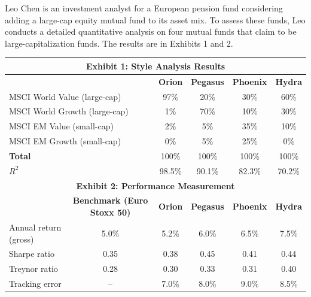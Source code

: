 \documentclass{article}
\newcounter{question} %
\begin{document}
\begin{question}
    Leo Chen is an investment analyst for a European pension fund considering adding a large-cap equity mutual fund to its asset mix. To assess these funds, Leo conducts a detailed quantitative analysis on four mutual funds that claim to be large-capitalization funds. The results are in Exhibits 1 and 2.

    \begin{table}[H]
        \centering
        \renewcommand{\arraystretch}{1.2}
        \begin{tabular}{|l|c|c|c|c|c|}
            \hline
            \multicolumn{6}{|c|}{\textbf{Exhibit 1: Style Analysis Results}} \\
            \hline
            \multicolumn{2}{|l|}{ } & \textbf{Orion} & \textbf{Pegasus} & \textbf{Phoenix} & \textbf{Hydra} \\
            \hline
            \multicolumn{2}{|l|}{MSCI World Value (large-cap)} & 97\%  & 20\%  & 30\%  & 60\%  \\
            \multicolumn{2}{|l|}{MSCI World Growth (large-cap)} & 1\%   & 70\%  & 10\%  & 30\%  \\
            \multicolumn{2}{|l|}{MSCI EM Value (small-cap)}   & 2\%   & 5\%   & 35\%  & 10\%  \\
            \multicolumn{2}{|l|}{MSCI EM Growth (small-cap)}  & 0\%   & 5\%   & 25\%  & 0\%   \\
            \multicolumn{2}{|l|}{\textbf{Total}}              & 100\% & 100\% & 100\% & 100\% \\
            \hline
            \multicolumn{2}{|l|}{$R^2$}                      & 98.5\% & 90.1\% & 82.3\% & 70.2\% \\
            \hline
            \multicolumn{6}{|c|}{\textbf{Exhibit 2: Performance Measurement}} \\
            \hline
            & \textbf{Benchmark (Euro Stoxx 50)} & \textbf{Orion} & \textbf{Pegasus} & \textbf{Phoenix} & \textbf{Hydra} \\
            \hline
            Annual return (gross) & 5.0\% & 5.2\% & 6.0\% & 6.5\% & 7.5\% \\
            Sharpe ratio          & 0.35  & 0.38 & 0.45 & 0.41 & 0.44 \\
            Treynor ratio         & 0.28  & 0.30 & 0.33 & 0.31 & 0.40 \\
            Tracking error        & --    & 7.0\%  & 8.0\% & 9.0\% & 8.5\% \\
            \hline
        \end{tabular}
    \end{table}


\end{question}
\end{document}
